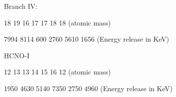  \vspace{1cm}
 
 
 \hspace{3 cm} Branch IV: \\	
 \begin{center}
 \end{center}
 \vspace{-2mm}
 \hspace{4.7cm} {\scriptsize 18 \hspace{0.6cm} 19 \hspace{0.6cm} 16 \hspace{0.7cm} 17 \hspace{0.9cm} 17 \hspace{0.7cm} 18 \hspace{1.0cm} 18 \hfill (atomic mass) \\
 	
 	\vspace{-2mm}
 	
 	\hspace{4.6cm} 7994 \hspace{0.4cm}  8114 \hspace{0.4cm}  600 \hspace{0.4cm}  2760 \hspace{0.7cm}  5610 \hspace{0.5cm} 1656 \hfill (Energy release in KeV)}
 
 \vspace{1cm}
 
 
 
 \hspace{3 cm} HCNO-I \\	
 \begin{center}
 \end{center}
 \vspace{-2mm}
 \hspace{4.6cm} {\scriptsize 12 \hspace{0.6cm} 13 \hspace{0.7cm} 13 \hspace{1.0cm} 14 \hspace{0.7cm} 15 \hspace{0.9cm} 16 \hspace{0.7cm} 12 \hfill (atomic mass) \\
 	\vspace{-2mm}
 	
 	\hspace{4.5cm} 1950 \hspace{0.4cm}  4630 \hspace{0.5cm}  5140 \hspace{0.6cm}  7350 \hspace{0.5cm}  2750 \hspace{0.6cm} 4960 \hfill (Energy release in KeV)}
 
